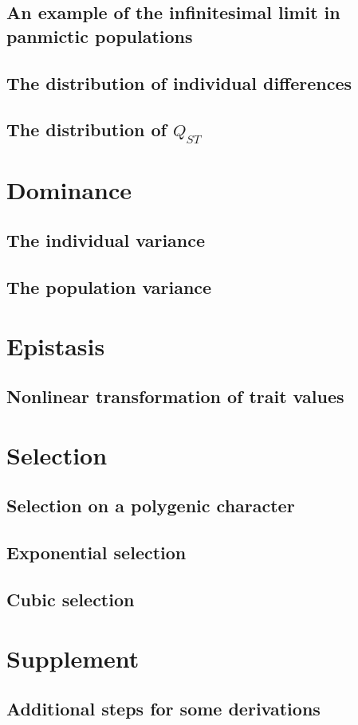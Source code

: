 \documentclass{article}
\begin{document}
\subsection{An example of the infinitesimal limit in panmictic populations}

\subsection{The distribution of individual differences}

\subsection{The distribution of $Q_{ST}$}

\section{Dominance}
\subsection{The individual variance}

\subsection{The population variance}

\section{Epistasis}
\subsection{Nonlinear transformation of trait values}

\section{Selection}
\subsection{Selection on a polygenic character}

\subsection{Exponential selection}

\subsection{Cubic selection}


\clearpage



\section{Supplement}
\subsection{Additional steps for some derivations}

\end{document}
